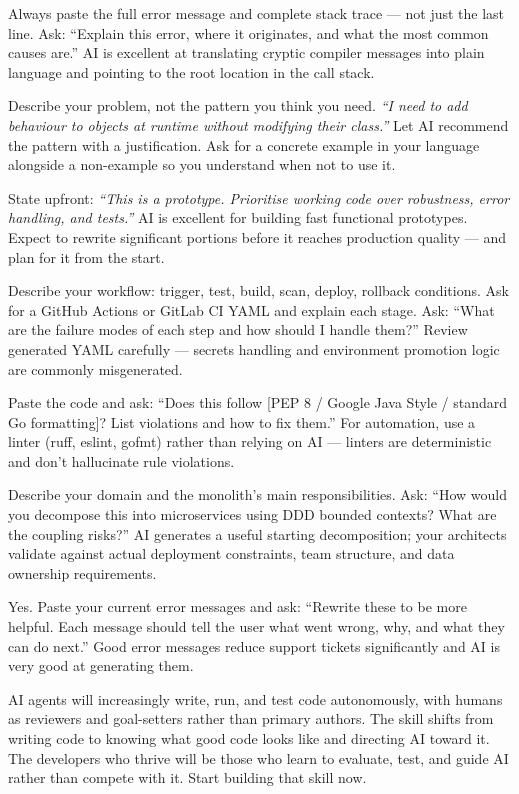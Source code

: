 {Always paste the full error message and complete stack trace --- not just the last line.
Ask: ``Explain this error, where it originates, and what the most common causes are.''
AI is excellent at translating cryptic compiler messages into plain language and
pointing to the root location in the call stack.}

{Describe your problem, not the pattern you think you need.
\textit{``I need to add behaviour to objects at runtime without modifying their class.''}
Let AI recommend the pattern with a justification.
Ask for a concrete example in your language alongside a non-example so you understand
when not to use it.}

{State upfront: \textit{``This is a prototype. Prioritise working code over robustness,
error handling, and tests.''}
AI is excellent for building fast functional prototypes.
Expect to rewrite significant portions before it reaches production quality ---
and plan for it from the start.}

{Describe your workflow: trigger, test, build, scan, deploy, rollback conditions.
Ask for a GitHub Actions or GitLab CI YAML and explain each stage.
Ask: ``What are the failure modes of each step and how should I handle them?''
Review generated YAML carefully --- secrets handling and environment promotion logic
are commonly misgenerated.}

{Paste the code and ask: ``Does this follow [PEP 8 / Google Java Style / standard Go
formatting]? List violations and how to fix them.''
For automation, use a linter (ruff, eslint, gofmt) rather than relying on AI --- linters
are deterministic and don't hallucinate rule violations.}

{Describe your domain and the monolith's main responsibilities.
Ask: ``How would you decompose this into microservices using DDD bounded contexts?
What are the coupling risks?''
AI generates a useful starting decomposition; your architects validate against actual
deployment constraints, team structure, and data ownership requirements.}

{Yes.
Paste your current error messages and ask: ``Rewrite these to be more helpful.
Each message should tell the user what went wrong, why, and what they can do next.''
Good error messages reduce support tickets significantly and AI is very good at
generating them.}

{AI agents will increasingly write, run, and test code autonomously, with humans
as reviewers and goal-setters rather than primary authors.
The skill shifts from writing code to knowing what good code looks like and directing
AI toward it.
The developers who thrive will be those who learn to evaluate, test, and guide AI
rather than compete with it.
Start building that skill now.}
